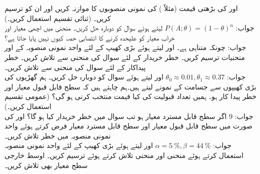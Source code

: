 \quad
{} اور  کی بڑھتی قیمت (مثلاً ) کی نمونی منصوبوں کا موازنہ کریں اور ان کو ترسیم کریں۔ (ثنائی تقسیم استعمال کریں۔)\\
جواب:\quad
$P(A;\theta)=(1-\theta)^n$
\quad
{} لیتے ہوئے  سوال  کو دوبارہ حل کریں۔
\quad
{} منحنی میں اچھی معیار اور خراب معیار کو علیحدہ کرنے کا انتصابی حصہ کیوں نہیں پایا جاتا ہے؟\\
جواب:\quad
چونکہ  متناہی ہے۔ 
\quad
{} اور  لیتے ہوئے بڑی کھیپ کے لئے واحد نمونی منصوبہ کے   اور  منحنیات ترسیم کریں۔
\quad
خطر خریدار  کے لئے سوال  کی منحنی سے  تلاش کریں۔ خطر پیداکار  کے لئے سوال  کی منحنی سے  تلاش کریں۔\\
جواب:\quad
$\theta_0\approx 0.01, \theta_1\approx 0.37$
\quad
{} اور  لیتے ہوئے سوال  کو دوبارہ حل کریں۔
\quad
ہم گھڑیوں کی بڑی کھیپوں سے  جسامت کے نمونے لیتے ہیں۔ہم چاہتے ہیں کہ  سطح قابل قبول معیار  اور خطر پیدا کار  ہو۔ ہمیں تعداد قبولیت  کی کیا قیمت منتخب کرنی ہو گی؟ (عمومی تقسیم استعمال کریں۔)\\
جواب:\quad
$9$
\quad
اگر  سطح قابل مسترد معیار  ہو تب  سوال  میں خطر خریدار کیا ہو گا؟
\quad
{} اور  کی صورت میں سطح قابل قبول معیار  اور سطح قابل مسترد معیار  فرض کرتے ہوئے واحد نمونی منصوبہ میں خطر تلاش کریں۔\\
جواب:\quad
$\alpha=\SI{5}{\percent},\beta=\SI{44}{\percent}$
\quad
{} اور  لیتے ہوئے بڑی کھیپ کے لئے واحد نمونی منصوبہ استعمال کرتے ہوئے  منحنی اور  منحنی تلاش کرتے ہوئے ترسیم کریں۔ اوسط خارجی سطح معیار بھی تلاش کریں۔

